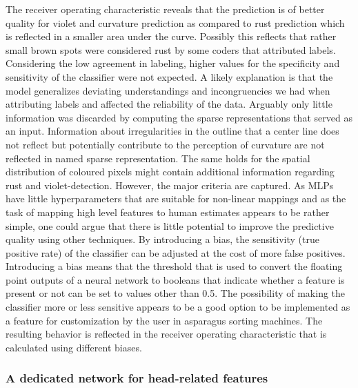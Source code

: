 The receiver operating characteristic reveals that the prediction is of better quality for violet and curvature prediction as compared to rust prediction which is reflected in a smaller area under the curve. Possibly this reflects that rather small brown spots were considered rust by some coders that attributed labels. \\
Considering the low agreement in labeling, higher values for the specificity and sensitivity of the classifier were not expected. A likely explanation is that the model generalizes deviating understandings and incongruencies we had when attributing labels and affected the reliability of the data. Arguably only little information was discarded by computing the sparse representations that served as an input. Information about irregularities in the outline that a center line does not reflect but potentially contribute to the perception of curvature are not reflected in named sparse representation. The same holds for the spatial distribution of coloured pixels might contain additional information regarding rust and violet-detection. However, the major criteria are captured. As MLPs have little hyperparameters that are suitable for non-linear mappings and  as the task of mapping high level features to human estimates appears to be rather simple, one could argue that there is little potential to improve the predictive quality using other techniques. By introducing a bias, the sensitivity (true positive rate) of the classifier can be adjusted at the cost of more false positives. Introducing a bias means that the threshold that is used to convert the floating point outputs of a neural network to booleans that indicate whether a feature is present or not can be set to values other than 0.5. The possibility of making the classifier more or less sensitive appears to be a good option to be implemented as a feature for customization by the user in asparagus sorting machines. The resulting behavior is reflected in the receiver operating characteristic that is calculated using different biases.



\subsubsection{A dedicated network for head-related features}
\label{subsec:HeadNetwork}

